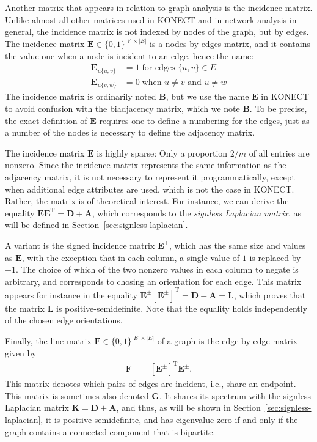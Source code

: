 \documentclass{article}
\begin{document}
Another matrix that appears in relation to graph analysis is the
incidence matrix.  Unlike almost all other matrices used in KONECT and
in network analysis in general, the incidence matrix is not indexed by
nodes of the graph, but by edges.  The incidence matrix $\mathbf E \in
\{0,1\}^{|V|\times|E|}$ is a nodes-by-edges matrix, and it contains the
value one when a node is incident to an edge, hence the name:
\begin{align*}
  \mathbf E_{u \{u,v\}} &= 1 \;\text{for edges $\{u,v\} \in E$} \\
  \mathbf E_{u \{v,w\}} &= 0 \;\text{when $u \neq v$ and $u \neq w$}
\end{align*}
The incidence matrix is ordinarily noted $\mathbf B$, but we use the name
$\mathbf E$ in KONECT to avoid confusion with the biadjacency matrix,
which we note $\mathbf B$. 
To be precise, the exact definition of $\mathbf E$ requires one to
define a numbering for the edges, just as a number of the nodes is necessary
to define the adjacency matrix. 

The incidence matrix $\mathbf E$ is highly sparse:  Only a proportion
$2/m$ of all entries are nonzero.  Since the incidence matrix represents
the same information as the adjacency matrix, it is not necessary to represent
it programmatically, except when additional edge attributes are used,
which is not the case in KONECT.  Rather, the matrix is of theoretical
interest.  For instance, we can derive the equality $\mathbf E \mathbf
E^{\mathrm T} = \mathbf D + \mathbf A$, which corresponds to the
\emph{signless Laplacian matrix}, as will be defined in
Section~\ref{sec:signless-laplacian}.  

A variant is the signed incidence matrix $\mathbf E^{\pm}$, which has
the same size and values as $\mathbf E$, with the exception that in each
column, a single value of $1$ is replaced by $-1$.  The choice of which
of the two nonzero values in each column to negate is arbitrary, and
corresponds to chosing an orientation for each edge.  
This matrix appears
for instance in the equality $\mathbf E^{\pm} [\mathbf E^{\pm}]^{\mathrm
  T} = \mathbf D - \mathbf A = \mathbf L$, which proves that the matrix
$\mathbf L$ is positive-semidefinite.  Note that the equality holds
independently of the chosen edge orientations. 

Finally, the line matrix $\mathbf F \in \{0,1\}^{|E|\times|E|}$ of a graph is the edge-by-edge
matrix given by 
\begin{align}
  \mathbf F &= [\mathbf E^{\pm}]^{\mathrm T} \mathbf E^{\pm}.
\end{align}
This matrix denotes which pairs of edges are incident, i.e., share an
endpoint.  This matrix is sometimes also denoted $\mathbf G$.  It shares
its spectrum with the signless Laplacian matrix $\mathbf K = \mathbf D +
\mathbf A$, and thus, as will be shown in
Section~\ref{sec:signless-laplacian}, it is positive-semidefinite, and
has eigenvalue zero if and only if the graph contains a connected
component that is bipartite. 
\end{document}
